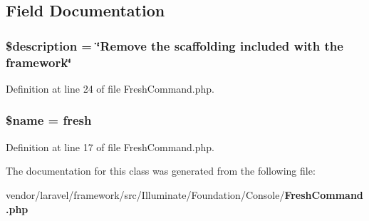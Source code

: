 \subsection{Field Documentation}
\subsubsection[{\$description}]{\setlength{\rightskip}{0pt plus 5cm}\$description = \char`\"{}Remove the scaffolding included with the framework\char`\"{}\hspace{0.3cm}{\ttfamily [protected]}}\label{class_illuminate_1_1_foundation_1_1_console_1_1_fresh_command_a87b032cba06009e3467abf1c8018d960}


Definition at line 24 of file Fresh\+Command.\+php.

\subsubsection[{\$name}]{\setlength{\rightskip}{0pt plus 5cm}\${\bf name} = \textquotesingle{}fresh\textquotesingle{}\hspace{0.3cm}{\ttfamily [protected]}}\label{class_illuminate_1_1_foundation_1_1_console_1_1_fresh_command_ab2fc40d43824ea3e1ce5d86dee0d763b}


Definition at line 17 of file Fresh\+Command.\+php.



The documentation for this class was generated from the following file\+:\begin{DoxyCompactItemize}
\item 
vendor/laravel/framework/src/\+Illuminate/\+Foundation/\+Console/{\bf Fresh\+Command.\+php}\end{DoxyCompactItemize}
